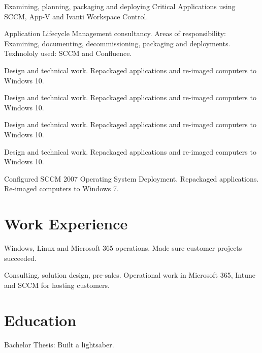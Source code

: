 \documentclass[11pt,a4paper]{moderncv}
\begin{document}
{Examining, planning, packaging and deploying Critical Applications using SCCM, App-V
and Ivanti Workspace Control.}

{Application Lifecycle Management consultancy. Areas of responsibility: Examining, documenting, decommissioning, packaging and deployments.
Texhnololy used: SCCM and Confluence.}

{Design and technical work. Repackaged applications and re-imaged computers to Windows 10.}

{Design and technical work. Repackaged applications and re-imaged computers to Windows 10.}

{Design and technical work. Repackaged applications and re-imaged computers to Windows 10.}

{Design and technical work. Repackaged applications and re-imaged computers to Windows 10.}

{Configured SCCM 2007 Operating System Deployment. Repackaged applications. Re-imaged computers to Windows 7.}

\section{Work Experience}
{Windows, Linux and Microsoft 365 operations. Made sure customer projects succeeded.}

{Consulting, solution design, pre-sales. Operational work in Microsoft 365, Intune and SCCM for hosting customers.}

\section{Education}
{Bachelor Thesis: Built a lightsaber.}
\end{document}
